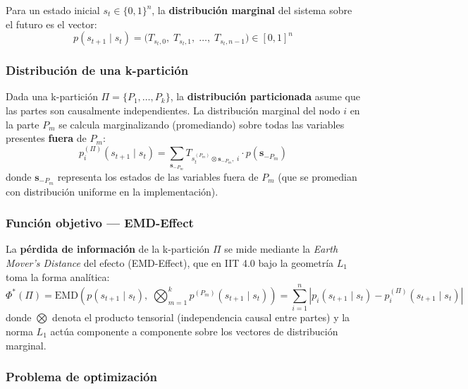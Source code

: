 Para un estado inicial $s_t \in \{0,1\}^n$, la \textbf{distribución marginal} del sistema
sobre el futuro es el vector:
\begin{equation}
  p(s_{t+1} \mid s_t) = \bigl(T_{s_t, 0},\; T_{s_t, 1},\; \ldots,\; T_{s_t, n-1}\bigr)
  \in [0,1]^n
  \label{eq:dist_marginal}
\end{equation}

\subsubsection*{Distribución de una k-partición}

Dada una k-partición $\Pi = \{P_1, \ldots, P_k\}$, la \textbf{distribución particionada}
asume que las partes son causalmente independientes. La distribución marginal del nodo $i$
en la parte $P_m$ se calcula marginalizando (promediando) sobre todas las variables presentes
\textbf{fuera} de $P_m$:
\begin{equation}
  p_i^{(\Pi)}(s_{t+1} \mid s_t) = \sum_{\mathbf{s}_{-P_m}} T_{s_t^{(P_m)} \otimes \mathbf{s}_{-P_m},\; i}
  \cdot p(\mathbf{s}_{-P_m})
  \label{eq:dist_particionada}
\end{equation}
donde $\mathbf{s}_{-P_m}$ representa los estados de las variables fuera de $P_m$ (que se
promedian con distribución uniforme en la implementación).

\subsubsection*{Función objetivo — EMD-Effect}

La \textbf{pérdida de información} de la k-partición $\Pi$ se mide mediante la
\textit{Earth Mover's Distance} del efecto (EMD-Effect), que en IIT 4.0 bajo la geometría
$L_1$ toma la forma analítica:
\begin{equation}
  \Phi^*(\Pi) = \mathrm{EMD}\!\left(
    p(s_{t+1} \mid s_t),\;
    \bigotimes_{m=1}^{k} p^{(P_m)}(s_{t+1} \mid s_t)
  \right)
  = \sum_{i=1}^{n} \left| p_i(s_{t+1} \mid s_t) - p_i^{(\Pi)}(s_{t+1} \mid s_t) \right|
  \label{eq:phi}
\end{equation}
donde $\bigotimes$ denota el producto tensorial (independencia causal entre partes) y la norma
$L_1$ actúa componente a componente sobre los vectores de distribución marginal.

\subsubsection*{Problema de optimización}

